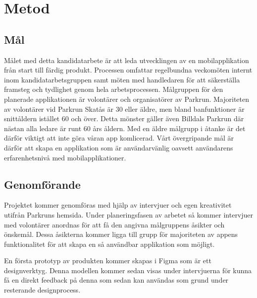\section{Metod}




\subsection{Mål}
Målet med detta kandidatarbete är att leda utvecklingen av en mobilapplikation från start till färdig produkt. Processen omfattar regelbundna veckomöten internt inom kandidatarbetsgruppen samt möten med handledaren för att säkerställa framsteg och tydlighet genom hela arbetsprocessen. Målgruppen för den planerade applikationen är volontärer och organisatörer av Parkrun.  Majoriteten av volontärer vid Parkrun Skatås är 30 eller äldre, men bland banfunktioner är snittåldern istället 60 och över. Detta mönster gäller även Billdals Parkrun där nästan alla ledare är runt 60 års åldern. Med en äldre målgrupp i åtanke är det därför viktigt att inte göra våran app komlicerad. Vårt övergripande mål är därför att skapa en applikation som är användarvänlig oavsett användarens erfarenhetsnivå med mobilapplikationer.



\subsection{Genomförande}

Projektet kommer genomföras med hjälp av intervjuer och egen kreativitet utifrån Parkruns hemsida. 
Under planeringsfasen av arbetet så kommer intervjuer med volontärer anordnas för att få den angivna målgruppens åsikter och önskemål. 
Dessa åsikterna kommer ligga till grupp för majoriteten av appens funktionalitet för att skapa en så användbar applikation som möjligt. 

En första prototyp av produkten kommer skapas i Figma som är ett designverktyg. Denna modellen kommer sedan visas under intervjuerna för 
kunna få en direkt feedback på denna som sedan kan användas som grund under resterande designprocess.



